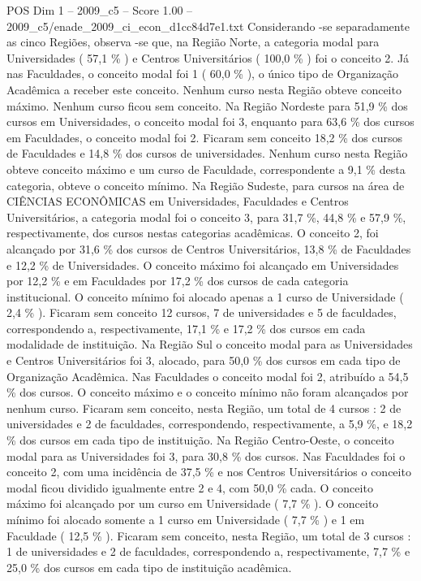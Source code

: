 \begin{textsample}{POS Dim 1 – 2009\_c5 – Score 1.00 – 2009\_c5/enade\_2009\_ci\_econ\_d1cc84d7e1.txt}
Considerando -se separadamente as cinco Regiões, observa -se que, na Região Norte, a categoria modal para Universidades ( 57,1 \% ) e Centros Universitários ( 100,0 \% ) foi o conceito 2.
Já nas Faculdades, o conceito modal foi 1 ( 60,0 \% ), o único tipo de Organização Acadêmica a receber este conceito.
Nenhum curso nesta Região obteve conceito máximo.
Nenhum curso ficou sem conceito.
Na Região Nordeste para 51,9 \% dos cursos em Universidades, o conceito modal foi 3, enquanto para 63,6 \% dos cursos em Faculdades, o conceito modal foi 2.
Ficaram sem conceito 18,2 \% dos cursos de Faculdades e 14,8 \% dos cursos de universidades.
Nenhum curso nesta Região obteve conceito máximo e um curso de Faculdade, correspondente a 9,1 \% desta categoria, obteve o conceito mínimo.
Na Região Sudeste, para cursos na área de CIÊNCIAS ECONÔMICAS em Universidades, Faculdades e Centros Universitários, a categoria modal foi o conceito 3, para 31,7 \%, 44,8 \% e 57,9 \%, respectivamente, dos cursos nestas categorias acadêmicas.
O conceito 2, foi alcançado por 31,6 \% dos cursos de Centros Universitários, 13,8 \% de Faculdades e 12,2 \% de Universidades.
O conceito máximo foi alcançado em Universidades por 12,2 \% e em Faculdades por 17,2 \% dos cursos de cada categoria institucional.
O conceito mínimo foi alocado apenas a 1 curso de Universidade ( 2,4 \% ).
Ficaram sem conceito 12 cursos, 7 de universidades e 5 de faculdades, correspondendo a, respectivamente, 17,1 \% e 17,2 \% dos cursos em cada modalidade de instituição.
Na Região Sul o conceito modal para as Universidades e Centros Universitários foi 3, alocado, para 50,0 \% dos cursos em cada tipo de Organização Acadêmica.
Nas Faculdades o conceito modal foi 2, atribuído a 54,5 \% dos cursos.
O conceito máximo e o conceito mínimo não foram alcançados por nenhum curso.
Ficaram sem conceito, nesta Região, um total de 4 cursos : 2 de universidades e 2 de faculdades, correspondendo, respectivamente, a 5,9 \%, e 18,2 \% dos cursos em cada tipo de instituição.
Na Região Centro-Oeste, o conceito modal para as Universidades foi 3, para 30,8 \% dos cursos.
Nas Faculdades foi o conceito 2, com uma incidência de 37,5 \% e nos Centros Universitários o conceito modal ficou dividido igualmente entre 2 e 4, com 50,0 \% cada.
O conceito máximo foi alcançado por um curso em Universidade ( 7,7 \% ).
O conceito mínimo foi alocado somente a 1 curso em Universidade ( 7,7 \% ) e 1 em Faculdade ( 12,5 \% ).
Ficaram sem conceito, nesta Região, um total de 3 cursos : 1 de universidades e 2 de faculdades, correspondendo a, respectivamente, 7,7 \% e 25,0 \% dos cursos em cada tipo de instituição acadêmica.

\end{textsample}
